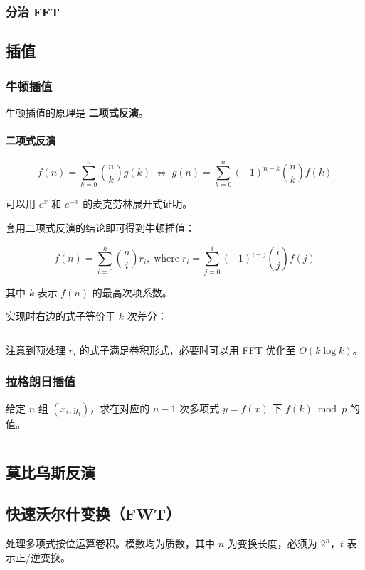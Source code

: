 \documentclass[a4paper, twoside]{article}
\begin{document}
    \subsubsection{分治 FFT}

\subsection{插值}
    \subsubsection{牛顿插值}
    \label{NewtonInterpolation}
    牛顿插值的原理是 \textbf{二项式反演}。

    \paragraph{二项式反演}
    
        $$ f(n) = \sum_{k = 0} ^ n \binom{n}{k} g(k) \; \iff \; g(n) = \sum_{k = 0} ^ n \left( -1 \right) ^ {n - k} \binom{n}{k} f(k) $$
    
    可以用 $e^x$ 和 $e^{-x}$ 的麦克劳林展开式证明。
    
    套用二项式反演的结论即可得到牛顿插值：
    
        $$ f(n) = \sum_{i = 0} ^ k \binom{n}{i} r_i , \; \text{where} \; r_i = \sum_{j = 0} ^ i (-1) ^ {i - j} \binom{i}{j} f(j) $$
    
    其中 $k$ 表示 $f(n)$ 的最高次项系数。
    
    实现时右边的式子等价于 $k$ 次差分：
    
    \inputminted{cpp}{../src/数学/牛顿插值.cpp}
    
    注意到预处理 $r_i$ 的式子满足卷积形式，必要时可以用 FFT 优化至 $O(k\log k)$。

    \subsubsection{拉格朗日插值}
    给定 $n$ 组 $(x_i, y_i)$，求在对应的 $n−1$ 次多项式 $y=f(x)$ 下 $f(k) \bmod p$ 的值。
    \inputminted{cpp}{../src/数学/拉格朗日插值.cpp}

\subsection{莫比乌斯反演}

\subsection{快速沃尔什变换（FWT）}
处理多项式按位运算卷积。模数均为质数，其中 $n$ 为变换长度，必须为 $2^n$，$t$ 表示正/逆变换。
\inputminted{cpp}{../src/数学/FWT.cpp}
\end{document}
